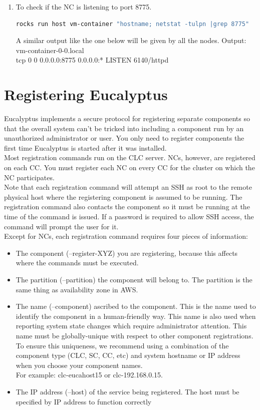\begin{enumerate}
\item To check if the NC is listening to port 8775.
\begin{lstlisting}[language=bash]
rocks run host vm-container "hostname; netstat -tulpn |grep 8775"
\end{lstlisting}
A similar output like the one below will be given by all the nodes.
Output:\\
vm-container-0-0.local \\
tcp   \hspace{6mm}     0   \hspace{6mm}   0 0.0.0.0:8775 \hspace{6mm}               0.0.0.0:*                  \hspace{6mm} LISTEN      6140/httpd 
\end{enumerate}
\section{Registering Eucalyptus}
Eucalyptus implements a secure protocol for registering separate components so that the overall system can’t be tricked into including a component run by an unauthorized administrator or user. You only need to register components the first time Eucalyptus is started after it was installed.\\
Most registration commands run on the CLC server. NCs, however, are registered on each CC. You must register each NC on every CC for the cluster on which the NC participates.\\
Note that each registration command will attempt an SSH as root to the remote physical host where the registering component is assumed to be running. The registration command also contacts the component so it must be running at the time of the command is issued. If a password is required to allow SSH access, the command will prompt the user for it.\\
Except for NCs, each registration command requires four pieces of information:
\begin{itemize}
\item The component (--register-XYZ) you are registering, because this affects where the commands must be executed.
\item The partition (--partition) the component will belong to. The partition is the same thing as availability zone in AWS.
\item The name (--component) ascribed to the component. This is the name used to identify the component in a human-friendly way. This name is also used when reporting system state changes which require administrator attention. This name must be globally-unique with respect to other component registrations.\\
To ensure this uniqueness, we recommend using a combination of the component type (CLC, SC, CC, etc) and system hostname or IP address when you choose your component names. \\
For example: clc-eucahost15 or clc-192.168.0.15.
\item The IP address (--host) of the service being registered. The host must be specified by IP address to function correctly
\end{itemize}
